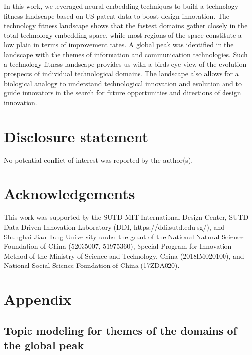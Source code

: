 \documentclass{article}
\begin{document}
In this work, we leveraged neural embedding techniques to build a technology fitness landscape based on US patent data to boost design innovation. The technology fitness landscape shows that the fastest domains gather closely in the total technology embedding space, while most regions of the space constitute a low plain in terms of improvement rates. A global peak was identified in the landscape with the themes of information and communication technologies. Such a technology fitness landscape provides us with a birds-eye view of the evolution prospects of individual technological domains. The landscape also allows for a biological analogy to understand technological innovation and evolution and to guide innovators in the search for future opportunities and directions of design innovation.

\section*{Disclosure statement}

No potential conflict of interest was reported by the author(s).

\section*{Acknowledgements}
This work was supported by the SUTD-MIT International Design Center, SUTD Data-Driven Innovation Laboratory (DDI, https://ddi.sutd.edu.sg/), and Shanghai Jiao Tong University under the grant of the National Natural Science Foundation of China (52035007, 51975360), Special Program for Innovation Method of the Ministry of Science and Technology, China (2018IM020100), and National Social Science Foundation of China (17ZDA020).




\section*{Appendix}
\subsection*{Topic modeling for themes of the domains of the global peak}
\end{document}
